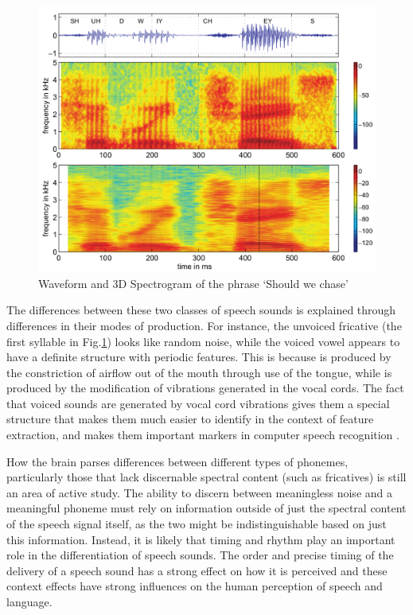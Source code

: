 \documentclass[titlepage]{article}
\begin{document}
    \begin{figure}
      \centering
      \includegraphics[scale=0.23]{exampleSpectrogram}
      \caption{Waveform and 3D Spectrogram of the phrase `Should we chase' \cite{Rabiner2007}}
      \label{exampleSpectrogram}
    \end{figure}


    The differences between these two classes of speech sounds is explained
    through differences in their modes of production. For instance, the unvoiced
    fricative \textipa{[S]} (the first syllable in Fig.\ref{exampleSpectrogram})
    looks like random noise, while the voiced vowel \textipa{[U]} appears to have
    a definite structure with periodic features. This is because \textipa{[S]} is
    produced by the constriction of airflow out of the mouth through use of the tongue,
    while \textipa{[U]} is produced by the modification of vibrations generated in the
    vocal cords. The fact that voiced sounds are generated by vocal cord vibrations gives
    them a special structure that makes them much easier to identify in the context of
    feature extraction, and makes them important markers in computer speech recognition
    \cite{Gutierrez-Osuna2017}.

    How the brain parses differences between different types of phonemes, particularly
    those that lack discernable spectral content (such as fricatives) is still an area
    of active study. The ability to discern between meaningless noise and a meaningful
    phoneme must rely on information outside of just the spectral content of the
    speech signal itself, as the two might be indistinguishable based on just this information.
    Instead, it is likely that timing and rhythm play an important role in the differentiation
    of speech sounds. The order and precise timing of the delivery of a speech sound has a
    strong effect on how it is perceived and these context effects have strong influences on
    the human perception of speech and language.
\end{document}
